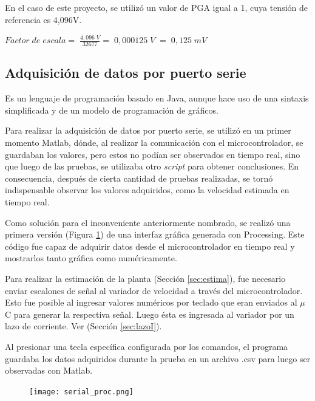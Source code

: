 En el caso de este proyecto, se utilizó un valor de PGA igual a 1, cuya tensión de referencia es 4,096V.
\begin{center}
	\begin{math}
		Factor\;de\;escala=\;\frac{4,096\;V}{32677}=\;0,000125\;V\;=\;0,125\;mV
	\end{math}
\end{center}


\subsection{Adquisición de datos por puerto serie}
\begin{tcolorbox}[colback=blue!5!white,colframe=blue!75!black,title=Processing]
Es un lenguaje de programación basado en Java, aunque hace uso de una sintaxis simplificada y de un modelo de programación de gráficos.	\cite{processing}
\end{tcolorbox}
Para realizar la adquisición de datos por puerto serie, se utilizó en un primer momento Matlab, dónde, al realizar la comunicación con el microcontrolador, se guardaban los valores, pero estos no podían ser observados en tiempo real, sino que luego de las pruebas, se utilizaba otro \textit{script} para obtener conclusiones. En consecuencia, después de cierta cantidad de pruebas realizadas, se tornó indispensable observar los valores adquiridos, como la velocidad estimada en tiempo real.

Como solución para el inconveniente anteriormente nombrado, se realizó una primera versión (Figura \ref{fig:Proce}) de una interfaz gráfica generada con Processing. Este código fue capaz de adquirir datos desde el microcontrolador en tiempo real y mostrarlos tanto gráfica como numéricamente. 

Para realizar la estimación de la planta (Sección \ref{sec:estima}), fue necesario enviar escalones de señal al variador de velocidad a través del microcontrolador. Esto fue posible al ingresar valores numéricos por teclado que eran enviados al $\mu$C para generar la respectiva señal. Luego ésta es ingresada al variador por un lazo de corriente. Ver (Sección \ref{sec:lazoI}).

Al presionar una tecla específica configurada por los comandos, el programa guardaba los datos adquiridos durante la prueba en un archivo .csv para luego ser observadas con Matlab.

\begin{figure}[]
	\centering
	\texttt{[image: serial\_proc.png]}
	\label{fig:Proce}    
\end{figure}


